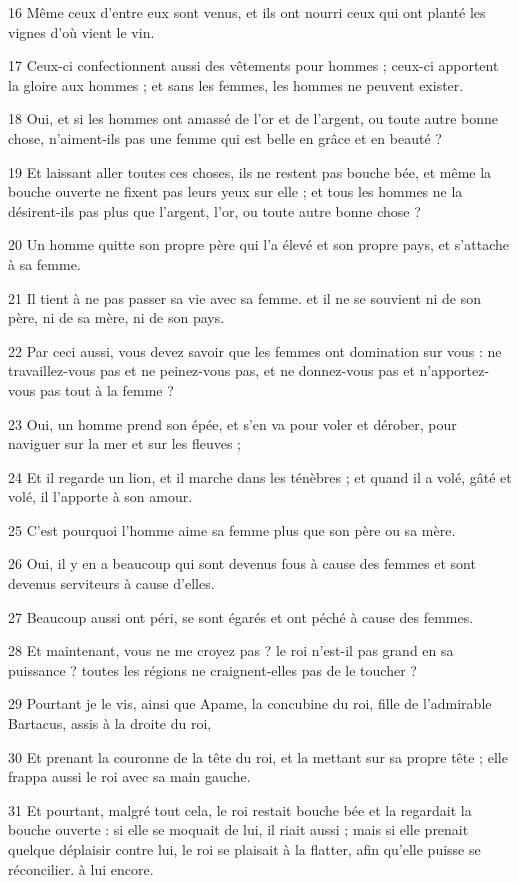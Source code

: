 \par 16 Même ceux d'entre eux sont venus, et ils ont nourri ceux qui ont planté les vignes d'où vient le vin.
\par 17 Ceux-ci confectionnent aussi des vêtements pour hommes ; ceux-ci apportent la gloire aux hommes ; et sans les femmes, les hommes ne peuvent exister.
\par 18 Oui, et si les hommes ont amassé de l'or et de l'argent, ou toute autre bonne chose, n'aiment-ils pas une femme qui est belle en grâce et en beauté ?
\par 19 Et laissant aller toutes ces choses, ils ne restent pas bouche bée, et même la bouche ouverte ne fixent pas leurs yeux sur elle ; et tous les hommes ne la désirent-ils pas plus que l'argent, l'or, ou toute autre bonne chose ?
\par 20 Un homme quitte son propre père qui l'a élevé et son propre pays, et s'attache à sa femme.
\par 21 Il tient à ne pas passer sa vie avec sa femme. et il ne se souvient ni de son père, ni de sa mère, ni de son pays.
\par 22 Par ceci aussi, vous devez savoir que les femmes ont domination sur vous : ne travaillez-vous pas et ne peinez-vous pas, et ne donnez-vous pas et n'apportez-vous pas tout à la femme ?
\par 23 Oui, un homme prend son épée, et s'en va pour voler et dérober, pour naviguer sur la mer et sur les fleuves ;
\par 24 Et il regarde un lion, et il marche dans les ténèbres ; et quand il a volé, gâté et volé, il l'apporte à son amour.
\par 25 C'est pourquoi l'homme aime sa femme plus que son père ou sa mère.
\par 26 Oui, il y en a beaucoup qui sont devenus fous à cause des femmes et sont devenus serviteurs à cause d'elles.
\par 27 Beaucoup aussi ont péri, se sont égarés et ont péché à cause des femmes.
\par 28 Et maintenant, vous ne me croyez pas ? le roi n'est-il pas grand en sa puissance ? toutes les régions ne craignent-elles pas de le toucher ?
\par 29 Pourtant je le vis, ainsi que Apame, la concubine du roi, fille de l'admirable Bartacus, assis à la droite du roi,
\par 30 Et prenant la couronne de la tête du roi, et la mettant sur sa propre tête ; elle frappa aussi le roi avec sa main gauche.
\par 31 Et pourtant, malgré tout cela, le roi restait bouche bée et la regardait la bouche ouverte : si elle se moquait de lui, il riait aussi ; mais si elle prenait quelque déplaisir contre lui, le roi se plaisait à la flatter, afin qu'elle puisse se réconcilier. à lui encore.
